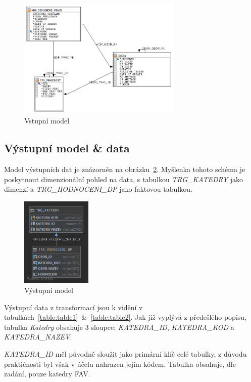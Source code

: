 \begin{figure}[htb]
    \centering
    \includegraphics[width=0.7\textwidth]{graphs/src-model.png}
    \caption{Vstupní model}
    \label{fig:src-model}
\end{figure}
\FloatBarrier

\subsection{Výstupní model \& data}

Model výstupních dat je znázorněn na obrázku~\ref{fig:trg-model}.
Myšlenka tohoto schéma je poskytnout dimenzionální pohled na data, s tabulkou \textit{TRG\_KATEDRY} jako dimenzí a \textit{TRG\_HODNOCENI\_DP} jako faktovou tabulkou.

\begin{figure}[htb]
    \centering
    \includegraphics[width=0.3\textwidth]{graphs/trg-model.png}
    \caption{Výstupní model}
    \label{fig:trg-model}
\end{figure}
\FloatBarrier

Výstupní data z transformací jsou k vidění v tabulkách~\ref{table:table1}~\&~\ref{table:table2}.
Jak již vyplývá z předešlého popisu, tabulka \textit{Katedry} obsahuje 3 sloupce: \textit{KATEDRA\_ID}, \textit{KATEDRA\_KOD} a \textit{KATEDRA\_NAZEV}.

\textit{KATEDRA\_ID} měl původně sloužit jako primární klíč celé tabulky, z důvodu praktičnosti byl však v účelu nahrazen jejím kódem.
Tabulka obsahuje, dle zadání, pouze katedry FAV.

